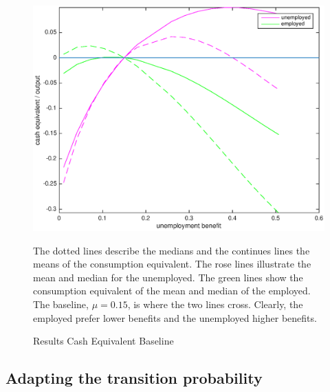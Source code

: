 \documentclass[a4paper,12pt]{article}
\begin{document}
\begin{figure}
\caption{Results Cash Equivalent Baseline } 
\label{baseline_ue_vs_e}	%
\centering
\includegraphics[scale=.7]{Cash_equivalent_baseline}  %

\begin{minipage}{0.8\linewidth}
\footnotesize{The dotted lines describe the medians and the continues lines the means of the consumption equivalent. The rose lines illustrate the mean and median for the unemployed. The green lines show the consumption equivalent of the mean and median of the employed. The baseline, $\mu = 0.15$, is where the two lines cross. Clearly, the employed prefer lower benefits and the unemployed higher benefits. }
\end{minipage}

\end{figure}

\subsection{Adapting the transition probability}







\newpage



\end{document}
